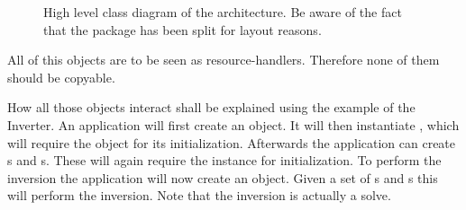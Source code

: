 \documentclass[twoside,a4paper]{article}
\begin{document}
\begin{sidewaysfigure}

\caption{High level class diagram of the \Optimal architecture. Be aware of the fact that the  package has been split for layout reasons.}
\label{cdOverview}

\end{sidewaysfigure}


All of this objects are to be seen as resource-handlers. Therefore none of them should be copyable.

How all those objects interact shall be explained using the example of the Inverter.
An application will first create an  object. It will then instantiate , which will require the  object for its initialization.
Afterwards the application can create s and s.
These will again require the  instance for initialization. To perform the inversion the application will now create an  object.
Given a set of s and s this will perform the inversion.
Note that the inversion is actually a solve. 
\end{document}
